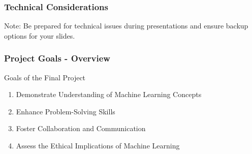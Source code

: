 \documentclass[aspectratio=169]{beamer}
\begin{document}
\begin{frame}[fragile]
    \frametitle{Technical Considerations}
    \begin{block}{Note:}
        Be prepared for technical issues during presentations and ensure backup options for your slides.
    \end{block}
\end{frame}

\begin{frame}[fragile]
    \frametitle{Project Goals - Overview}
    \begin{block}{Goals of the Final Project}
        \begin{enumerate}
            \item Demonstrate Understanding of Machine Learning Concepts
            \item Enhance Problem-Solving Skills
            \item Foster Collaboration and Communication
            \item Assess the Ethical Implications of Machine Learning
        \end{enumerate}
    \end{block}
\end{frame}
\end{document}
